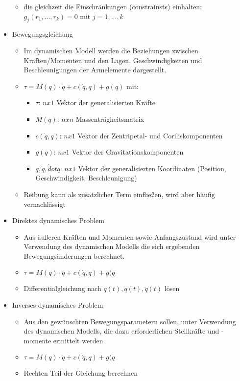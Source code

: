 \documentclass[paper=a4, fontsize=11pt]{scrartcl} %
\numberwithin{equation}{section} %
\numberwithin{figure}{section} %
\numberwithin{table}{section} %
\begin{document}
\begin{itemize}
\begin{itemize}
\item die gleichzeit die Einschränkungen (constrainsts) einhalten: $g_j(r_1,...,r_k) = 0$ mit $j = 1,...,k$
\end{itemize}
\item Bewegungsgleichung
\begin{itemize}
\item Im dynamischen Modell werden die Beziehungen zwischen Kräften/Momenten und den Lagen, Geschwindigkeiten und Beschleunigungen der Armelemente dargestellt.
\item $\tau = M(q) \cdot \ddot q + c(\dot q, q) + g(q)$ mit:
\begin{itemize}
\item $\tau$: $nx1$ Vektor der generalisierten Kräfte
\item $M(q)$: $nxn$ Massenträgheitsmatrix
\item $c(\dot q, q)$: $nx1$ Vektor der Zentripetal- und Coriliskomponenten
\item $g(q)$: $nx1$ Vektor der Gravitationskomponenten
\item $	q, \dot q, \dot dot q$: $nx1$ Vektor der generalisierten Koordinaten (Position, Geschwindigkeit, Beschleunigung)
\end{itemize}
\item Reibung kann als zusätzlicher Term einfließen, wird aber häufig vernachlässigt
\end{itemize}
\item Direktes dynamisches Problem
\begin{itemize}
\item Aus äußeren Kräften und Momenten sowie Anfangszustand wird unter Verwendung des dynamischen Modells die sich ergebenden Bewegungsänderungen berechnet.
\item $\tau = M(q) \cdot \ddot q + c(\dot q, q) + g(q$
\item Differentialgleichung nach $q(t), \dot q(t), \ddot q(t)$ lösen
\end{itemize}
\item Inverses dynamisches Problem
\begin{itemize}
\item Aus den gewünschten Bewegungsparametern sollen, unter Verwendung des dynamischen Modells, die dazu erforderlichen Stellkräfte und -momente ermittelt werden.
\item $\tau = M(q) \cdot \ddot q + c(\dot q, q) + g(q$
\item Rechten Teil der Gleichung berechnen
\end{itemize}
\end{itemize}
\end{document}
